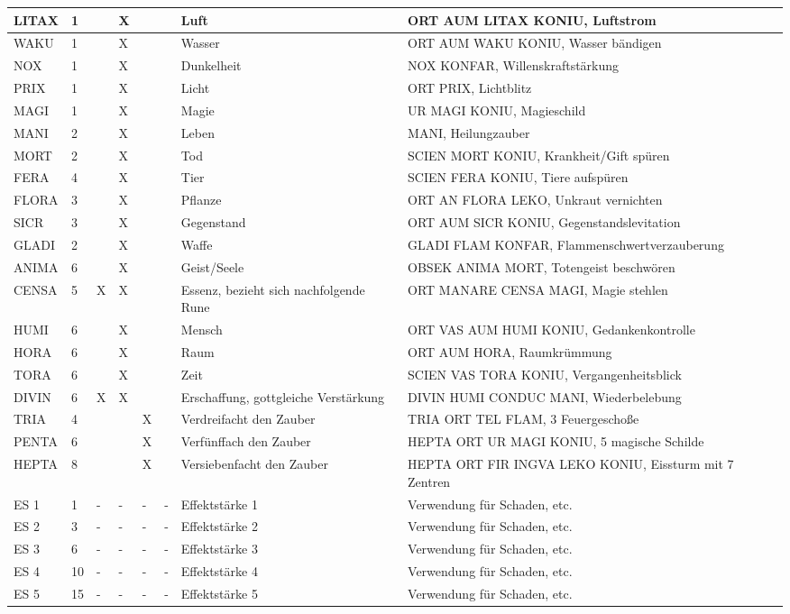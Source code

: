 \documentclass{article}
\begin{document}
\begin{footnotesize}
\begin{tabular}{|m{1.7cm}|m{0.3cm}|m{1cm}|m{1cm}|m{1cm}|m{1cm}|m{3cm}|m{5cm}|}
\hline
LITAX&1& &X& & &Luft&ORT AUM LITAX KONIU, Luftstrom\\
\hline
WAKU&1& &X& & &Wasser&ORT AUM WAKU KONIU, Wasser bändigen\\
\hline
NOX&1& &X& & &Dunkelheit&NOX KONFAR, Willenskraftstärkung\\
\hline
PRIX&1& &X& & &Licht&ORT PRIX, Lichtblitz\\
\hline
MAGI&1& &X& & &Magie&UR MAGI KONIU, Magieschild\\
\hline
MANI&2& &X& & &Leben&MANI, Heilungzauber\\
\hline
MORT&2& &X& & &Tod&SCIEN MORT KONIU, Krankheit/Gift spüren\\
\hline
\hline
FERA&4& &X& & &Tier&SCIEN FERA KONIU, Tiere aufspüren\\
\hline
FLORA&3& &X& & &Pflanze&ORT AN FLORA LEKO, Unkraut vernichten\\
\hline
SICR&3& &X& & &Gegenstand&ORT AUM SICR KONIU, Gegenstandslevitation\\
\hline
GLADI&2& &X& & &Waffe&GLADI FLAM KONFAR, Flammenschwertverzauberung\\
\hline
\hline
ANIMA&6& &X& & &Geist/Seele&OBSEK ANIMA MORT, Totengeist beschwören\\
\hline
CENSA&5&X&X& & &Essenz, bezieht sich nachfolgende Rune&ORT MANARE CENSA MAGI, Magie stehlen\\
\hline
HUMI&6& &X& & &Mensch&ORT VAS AUM HUMI KONIU, Gedankenkontrolle\\
\hline
HORA&6& &X& & &Raum&ORT AUM HORA, Raumkrümmung\\
\hline
TORA&6& &X& & &Zeit&SCIEN VAS TORA KONIU, Vergangenheitsblick\\
\hline
DIVIN&6&X&X& & &Erschaffung, gottgleiche Verstärkung&DIVIN HUMI CONDUC MANI, Wiederbelebung\\
\hline
TRIA&4& & &X& &Verdreifacht den Zauber&TRIA ORT TEL FLAM, 3 Feuergeschoße\\
\hline
PENTA&6& & &X& &Verfünffach den Zauber&HEPTA ORT UR MAGI KONIU, 5 magische Schilde\\
\hline
HEPTA&8& & &X& &Versiebenfacht den Zauber&HEPTA ORT FIR INGVA LEKO KONIU, Eissturm mit 7 Zentren\\
\hline
\hline
ES 1&1&-&-&-&-&Effektstärke 1&Verwendung für Schaden, etc.\\
\hline
ES 2&3&-&-&-&-&Effektstärke 2&Verwendung für Schaden, etc.\\
\hline
ES 3&6&-&-&-&-&Effektstärke 3&Verwendung für Schaden, etc.\\
\hline
ES 4&10&-&-&-&-&Effektstärke 4&Verwendung für Schaden, etc.\\
\hline
ES 5&15&-&-&-&-&Effektstärke 5&Verwendung für Schaden, etc.\\
\hline
\end{tabular}
\end{footnotesize}
\end{document}
